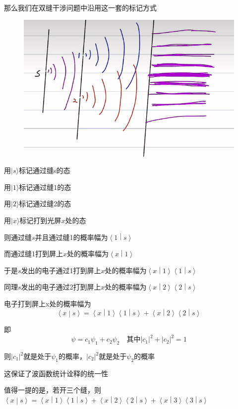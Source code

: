 \documentclass[lang=cn,10pt]{elegantbook}
\begin{document}
那么我们在双缝干涉问题中沿用这一套的标记方式
\begin{figure}[H]
	\centering
	\includegraphics[width=0.7\linewidth]{figure/screenshot008}
\end{figure}

用$|s\rangle $标记通过缝s的态

用$|1\rangle $标记通过缝1的态

用$|2\rangle $标记通过缝2的态

用$|x\rangle $标记打到光屏$x$处的态

则通过缝$s$并且通过缝1的概率幅为$\left< 1 \middle| s \right>$

而通过缝1打到屏上$x$处的概率幅为$\left< x \middle| 1 \right>$

于是$s$发出的电子通过1打到屏上$x$处的概率幅为$\left< x \middle| 1 \right>$$\left< 1 \middle| s \right>$

同理$s$发出的电子通过2打到屏上$x$处的概率幅为$\left< x \middle| 2 \right>$$\left< 2 \middle| s \right>$

电子打到屏上x处的概率幅为
\begin{equation}
	\left< x \middle| s \right>	=\left< x \middle| 1 \right>\left< 1 \middle| s \right>+\left< x \middle| 2 \right>\left< 2 \middle| s \right>
\end{equation}

即
\begin{equation}
	\psi=c_1\psi_1+c_2\psi_2\quad\text{其中}|c_1|^2+|c_2|^2=1
\end{equation}

则$|c_1|^2$就是处于$\psi_1$的概率，$|c_2|^2$就是处于$\psi_2$的概率

这保证了波函数统计诠释的统一性

值得一提的是，若开三个缝，则$	\left< x \middle| s \right>	=\left< x \middle| 1 \right>\left< 1 \middle| s \right>+\left< x \middle| 2 \right>\left< 2 \middle| s \right>+\left< x \middle| 3 \right>\left< 3 \middle| s \right>$
\end{document}
